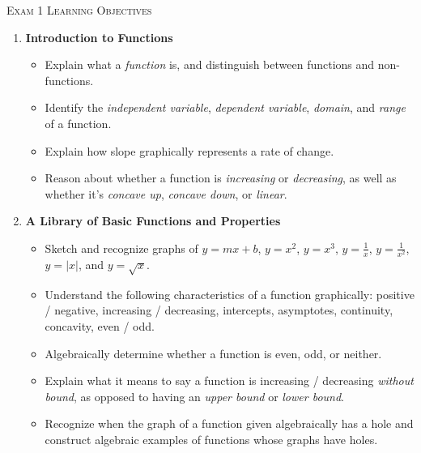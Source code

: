 \documentclass{article}
\begin{document}
\begin{center}
  \Large\textsc{Exam 1 Learning Objectives}
\end{center}

\begin{enumerate}
\item \textbf{Introduction to Functions} %
  \begin{itemize}

  \item Explain what a \emph{function} is, and distinguish between functions and non-functions.

  \item Identify the \emph{independent variable}, \emph{dependent variable}, \emph{domain}, and \emph{range} of a function.

  \item Explain how slope graphically represents a rate of change.

  \item Reason about whether a function is \emph{increasing} or \emph{decreasing}, as well as whether it's \emph{concave up}, \emph{concave down}, or \emph{linear}.

  \end{itemize}

\item \textbf{A Library of Basic Functions and Properties} %
  \begin{itemize}
  \item Sketch and recognize graphs of $y = mx + b$, $y = x^2$, $y = x^3$, $y = \frac{1}{x}$, $y = \frac{1}{x^2}$, $y = |x|$, and $y = \sqrt{x}$.

  \item Understand the following characteristics of a function graphically: positive / negative, increasing / decreasing, intercepts, asymptotes, continuity, concavity, even / odd.

  \item Algebraically determine whether a function is even, odd, or neither.

  \item Explain what it means to say a function is increasing / decreasing \emph{without bound}, as opposed to having an \emph{upper bound} or \emph{lower bound}.

  \item Recognize when the graph of a function given algebraically has a hole and construct algebraic examples of functions whose graphs have holes.

  \end{itemize}


\end{enumerate}
\end{document}
